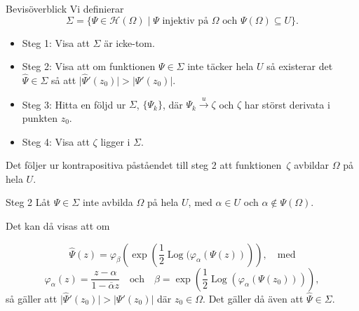 \documentclass{beamer}
\renewcommand{\phi}{\varphi}
\renewcommand{\H}{\mathscr{H}}
\newcommand{\Log}{\operatorname{Log}}
\newcommand{\abs}[1]{\left\lvert #1 \right\rvert}
\newcommand{\conj}[1]{\overline{#1}}
\begin{document}
\begin{frame}{Bevisöverblick}
Vi definierar
    \begin{equation*}
		\Sigma = \{ \Psi \in \H(\Omega) \mid \Psi \text{ injektiv på } \Omega \text{ och } \Psi(\Omega) \subseteq U\}.
    \end{equation*}
   \begin{itemize}
        \item[\(\boxtimes\)] Steg 1: Visa att $\Sigma$ är icke-tom.
        \item[\(\square\)] Steg 2: Visa att om funktionen $\Psi \in \Sigma$ inte täcker hela $U$ så existerar det $\hat{\Psi} \in \Sigma$ så att $\vert \hat{\Psi}'(z_0) \vert > \abs{\Psi'(z_0)}$.
        \item[\(\square\)] Steg 3: Hitta en följd ur $\Sigma$, $\{\Psi_k\}$, där  $\Psi_k \xrightarrow{u} \zeta$ och $\zeta$ har störst derivata i punkten $z_0$.
        \item[\(\square\)] Steg 4: Visa att $\zeta$ ligger i $\Sigma$.
    \end{itemize} 
    \vspace{0.3cm}
    Det följer ur kontrapositiva påståendet till steg 2 att funktionen~$\zeta$ avbildar $\Omega$ på hela $U$.
\end{frame}

\begin{frame}{Steg 2}
Låt $\Psi \in \Sigma$ inte avbilda $\Omega$ på hela $U$, med $\alpha \in U$ och $\alpha \notin \Psi(\Omega)$.

Det kan då visas att om

\begin{equation*}
    \hat{\Psi}(z) = \phi_\beta\left(\exp\left(\frac{1}{2} \Log (\phi_\alpha(\Psi(z))\right)\right), \quad \text{med}
\end{equation*}
\begin{equation*}
    \phi_\alpha(z) = \frac{z - \alpha}{1-\conj{\alpha}z} \quad \text{och} \quad \beta = \exp\left(\frac{1}{2} \Log\left(\phi_\alpha(\Psi(z_0))\right)\right),
\end{equation*}
så gäller att $\vert \hat{\Psi}'(z_0)\vert > \abs{\Psi'(z_0)}$ där $z_0 \in \Omega$. Det gäller då även att $\hat{\Psi} \in \Sigma$.
\end{frame}
\end{document}
